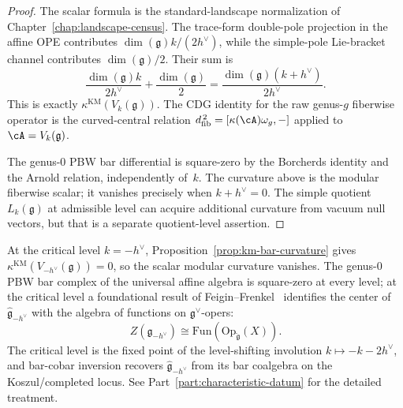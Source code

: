 \begin{proof}
The scalar formula is the standard-landscape normalization
of Chapter~\ref{chap:landscape-census}. The trace-form double-pole
projection in the affine OPE contributes
\(\dim(\mathfrak g)k/(2h^\vee)\), while the simple-pole Lie-bracket
channel contributes \(\dim(\mathfrak g)/2\). Their sum is
\[
\frac{\dim(\mathfrak g)k}{2h^\vee}
+\frac{\dim(\mathfrak g)}{2}
=\frac{\dim(\mathfrak g)(k+h^\vee)}{2h^\vee}.
\]
This is exactly
\(\kappa^{\mathrm{KM}}(V_k(\mathfrak g))\).
The CDG identity for the raw genus-$g$ fiberwise operator is the
curved-central relation
$d_{\mathrm{fib}}^{\,2}=[\kappa(\cA)\omega_g,-]$ applied to
\(\cA=V_k(\mathfrak g)\).

The genus-$0$ PBW bar differential is square-zero by the Borcherds
identity and the Arnold relation, independently of~$k$. The curvature
above is the modular fiberwise scalar; it vanishes precisely when
$k+h^\vee=0$. The simple quotient $L_k(\mathfrak g)$ at admissible
level can acquire additional curvature from vacuum null vectors, but
that is a separate quotient-level assertion.
\end{proof}

\begin{remark}
\label{rem:feigin-frenkel-center}
At the critical level $k = -h^\vee$,
Proposition~\ref{prop:km-bar-curvature} gives
\(\kappa^{\mathrm{KM}}(V_{-h^\vee}(\mathfrak g))=0\), so the scalar
modular curvature vanishes. The genus-$0$ PBW bar complex of the
universal affine algebra is square-zero at every level; at the critical
level a foundational result of Feigin--Frenkel~\cite{Feigin-Frenkel}
identifies the center of $\widehat{\mathfrak{g}}_{-h^\vee}$ with the
algebra of functions on $\mathfrak{g}^\vee$-opers:
\[
Z(\widehat{\mathfrak{g}}_{-h^\vee}) \cong \mathrm{Fun}(\mathrm{Op}_{\check{\mathfrak{g}}}(X)).
\]
The critical level is the fixed point of the level-shifting involution
$k \mapsto -k - 2h^\vee$, and bar-cobar inversion recovers
$\widehat{\mathfrak{g}}_{-h^\vee}$ from its bar coalgebra on the
Koszul/completed locus. See Part~\ref{part:characteristic-datum} for
the detailed treatment.
\end{remark}

